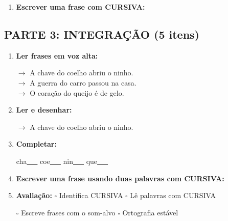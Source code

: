 \begin{exercicio}
\begin{enumerate}[resume]
  \item \textbf{Escrever uma frase com CURSIVA:}
  \begin{center}
  \underline{\hspace{12cm}}
  \end{center}

\end{enumerate}

\subsection*{PARTE 3: INTEGRAÇÃO (5 itens)}

\begin{enumerate}[resume]

  \item \textbf{Ler frases em voz alta:}
  \begin{center}
  $\rightarrow$ A chave do coelho abriu o ninho.\\
  $\rightarrow$ A guerra do carro passou na casa.\\
  $\rightarrow$ O coração do queijo é de gelo.\\
  \end{center}

  \item \textbf{Ler e desenhar:}
  \begin{center}
  $\rightarrow$ A chave do coelho abriu o ninho.
  \end{center}
  \begin{center}
  \end{center}

  \item \textbf{Completar:}
  \begin{center}
  cha\underline{~~~} \quad coe\underline{~~~} \quad nin\underline{~~~} \quad que\underline{~~~}
  \end{center}

  \item \textbf{Escrever uma frase usando duas palavras com CURSIVA:}
  \begin{center}
  \underline{\hspace{12cm}}
  \end{center}

  \item \textbf{Avaliação:} $\square$ Identifica CURSIVA \quad $\square$ Lê palavras com CURSIVA
  \begin{center}
  $\square$ Escreve frases com o som-alvo \quad $\square$ Ortografia estável
  \end{center}


\end{enumerate}
\end{exercicio}
